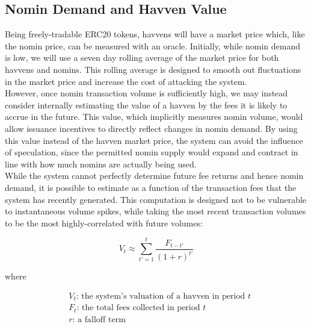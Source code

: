 \newpage

\subsection{Nomin Demand and Havven Value}

\noindent Being freely-tradable ERC20 tokens, havvens will have a market price which, like
the nomin price, can be measured with an oracle.
Initially, while nomin demand is low, we will use a seven day rolling average of the market price for both havvens and nomins.
This rolling average is designed to smooth out fluctuations in the market price and increase the cost of attacking the system.\\

\noindent However, once nomin transaction volume is sufficiently high, we may instead consider internally estimating
the value of a havven by the fees it is likely to accrue in the future. This value, which implicitly measures nomin volume,
would allow issuance incentives to directly reflect changes in nomin demand.
By using this value instead of the havven market price, the system can avoid the influence of speculation,
since the permitted nomin supply would expand and contract in line with how much nomins are actually being used. \\

\noindent While the system cannot perfectly determine future fee returns and hence nomin demand, it is possible to estimate as a
function of the transaction fees that the system has recently generated.
This computation is designed not to be vulnerable to instantaneous volume spikes, while taking the most recent transaction
volumes to be the most highly-correlated with future volumes:

\vspace{3mm}

\begin{equation}
    V_{t} \approx \sum_{t'=1}^{t} \frac{F_{t - t'}}{(1 + r)^{t'}} \label{eq:price}
\end{equation}

where

\begin{align*} 
& V_{t} \text{: the system's valuation of a havven in period } t  \\
& F_t \text{: the total fees collected in period } t\\
& r \text{: a falloff term}  \\
\end{align*}

